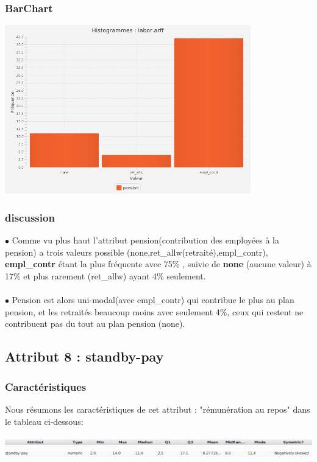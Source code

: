 \documentclass[12pt,a4paper,oneside]{book}
\begin{document}
\subsubsection{BarChart}
\begin{center}
	\includegraphics[width=0.8\textwidth]{screens/barchart/pension-barchart.png}%
	\label{labelname}%
\end{center}
\subsubsection{discussion}
$\bullet$ Comme vu plus haut l'attribut pension(contribution des employées à la pension) a trois valeurs possible (none,ret\_allw(retraité),empl\_contr), \textbf{empl\_contr} étant la plus fréquente avec  75\% , suivie de \textbf{none} (aucune valeur)
à 17\% et plus rarement (ret\_allw) ayant 4\% seulement.\\
\textbf{ }\\
$\bullet$ Pension est alors uni-modal(avec empl\_contr) qui contribue le plus  au plan pension, et les retraités beaucoup moins avec seulement 4\%, ceux qui restent ne contribuent pas du tout au plan pension (none).

\newpage

\subsection{Attribut 8 : standby-pay }
\subsubsection{Caractéristiques}
Nous résumons les caractéristiques de cet attribut : "rémunération au repos" dans le tableau ci-dessous:
\begin{center}
	\includegraphics[width=1\textwidth]{screens/att.png}\\ \includegraphics[width=1\textwidth]{screens/att-8.png}%
	\label{labelname}%
\end{center}
\end{document}
